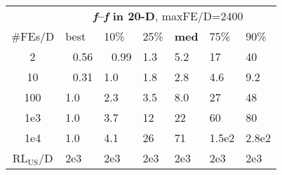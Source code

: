 \begin{tabular}{c|llllll}
 & \multicolumn{6}{|c}{\textbf{\textit{f}\raisebox{-0.35ex}{1}--\textit{f}\raisebox{-0.35ex}{24} in 20-D}, maxFE/D=2400}\\
\#FEs/D & best & 10\% & 25\% & \textbf{med} & 75\% & 90\%\\
2 & ~\,0.56 & ~\,0.99 & \hspace*{1ex}1.3 & \hspace*{1ex}5.2 & 17 & 40\\
10 & ~\,0.31 & \hspace*{1ex}1.0 & \hspace*{1ex}1.8 & \hspace*{1ex}2.8 & \hspace*{1ex}4.6 & \hspace*{1ex}9.2\\
100 & \hspace*{1ex}1.0 & \hspace*{1ex}2.3 & \hspace*{1ex}3.5 & \hspace*{1ex}8.0 & 27 & 48\\
1e3 & \hspace*{1ex}1.0 & \hspace*{1ex}3.7 & 12 & 22 & 60 & 80\\
1e4 & \hspace*{1ex}1.0 & \hspace*{1ex}4.1 & 26 & 71 & 1.5e2 & 2.8e2\\
$\text{RL}_{\text{US}}$/D & 2e3 & 2e3 & 2e3 & 2e3 & 2e3 & 2e3
\end{tabular}
